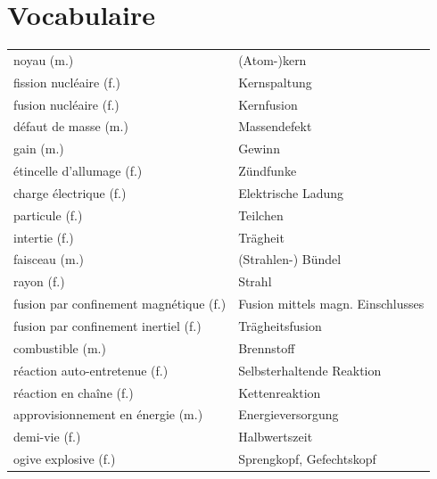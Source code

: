 \documentclass[12pt,a4paper]{article}
\begin{document}
\section*{Vocabulaire}
\begin{tabular}{|l|l|} %
\hline
noyau (m.) & (Atom-)kern \\
fission nucléaire (f.) & Kernspaltung \\
fusion nucléaire (f.) & Kernfusion \\
défaut de masse (m.) & Massendefekt \\
gain (m.) & Gewinn \\
étincelle d'allumage (f.) & Zündfunke \\
charge électrique (f.) & Elektrische Ladung \\
particule (f.) & Teilchen \\
intertie (f.) & Trägheit \\
faisceau (m.) & (Strahlen-) Bündel \\
rayon (f.) & Strahl \\
fusion par confinement magnétique (f.) & Fusion mittels magn. Einschlusses \\
fusion par confinement inertiel (f.) & Trägheitsfusion\\
combustible (m.) & Brennstoff \\
réaction auto-entretenue (f.) & Selbsterhaltende Reaktion \\
réaction en chaîne (f.) & Kettenreaktion \\
approvisionnement en énergie (m.) & Energieversorgung \\
demi-vie (f.) & Halbwertszeit\\
ogive explosive (f.) & Sprengkopf, Gefechtskopf \\
\hline
\end{tabular}
\end{document}
